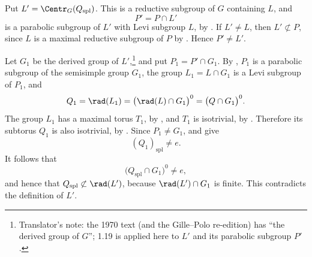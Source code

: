 Put \(L'=\Centr_G(Q_{\mathrm{spl}})\).  This is a reductive subgroup
of \(G\) containing \(L\), and
\[
 P'=P\cap L'
\]
is a parabolic subgroup of \(L'\) with Levi subgroup \(L\), by
.  If \(L'\ne L\), then \(L'\not\subset P\), since \(L\) is a
maximal reductive subgroup of \(P\) by .  Hence \(P'\ne L'\).

Let \(G_1\) be the derived group of \(L'\),\footnote{Translator's note: the 1970 text (and the Gille--Polo re-edition) has
``the derived group of \(G\)''; 1.19 is applied here to \(L'\) and its
parabolic subgroup \(P'\).} and put
\(P_1=P'\cap G_1\).  By , \(P_1\) is a parabolic subgroup of the
semisimple group \(G_1\), the group \(L_1=L\cap G_1\) is a Levi
subgroup of \(P_1\), and
\[
 Q_1=\rad(L_1)
    =\bigl(\rad(L)\cap G_1\bigr)^0
    =\bigl(Q\cap G_1\bigr)^0.
\]
The group \(L_1\) has a maximal torus \(T_1\), by ,
and \(T_1\) is isotrivial, by .  Therefore its
subtorus \(Q_1\) is also isotrivial, by .  Since
\(P_1\ne G_1\),  and  give
\[
 (Q_1)_{\mathrm{spl}}\ne e.
\]
It follows that
\[
 \bigl(Q_{\mathrm{spl}}\cap G_1\bigr)^0\ne e,
\]
and hence that \(Q_{\mathrm{spl}}\not\subset\rad(L')\), because
\(\rad(L')\cap G_1\) is finite.  This contradicts the definition of
\(L'\).
\SGAQED
